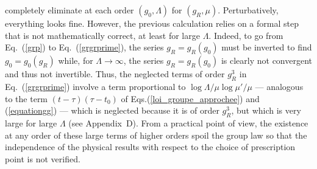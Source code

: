\documentclass[floatfix,preprintnumbers,amsmath,amssymb,prb,12pt]{revtex4-1}
\begin{document}
completely eliminate at each order $(g_0,\Lambda)$ for $(g_R,\mu)$.
Perturbatively, everything looks fine. However, the previous
calculation relies on a formal step that is not mathematically
correct, at least for large $\Lambda$. Indeed, to go from
Eq.~(\ref{grp}) to Eq.~(\ref{grgrprime}), the series
$g_R=g_R(g_0)$ must be inverted to find $g_0=g_0(g_R)$ while, for
$\Lambda\to\infty$, the series $g_R=g_R(g_0)$ is clearly not 
convergent and thus not invertible. Thus, the neglected terms of
order $g_R^3$ in Eq.~(\ref{grgrprime}) involve a term proportional
to $\log\Lambda/\mu \log\mu'/\mu$ --- analogous to the term
$(t-\tau)(\tau-t_0)$ of Eqs.(\ref{loi_groupe_approchee}) and
(\ref{equationgg}) --- which is neglected because it is of order
$g_R^3$, but which is very large for large $\Lambda$ (see
Appendix~D). From a practical point of view, the existence at any
order of these large terms of higher orders spoil the group law 
so that the independence of the physical results with respect to
the choice of prescription point is not verified. 
\end{document}
